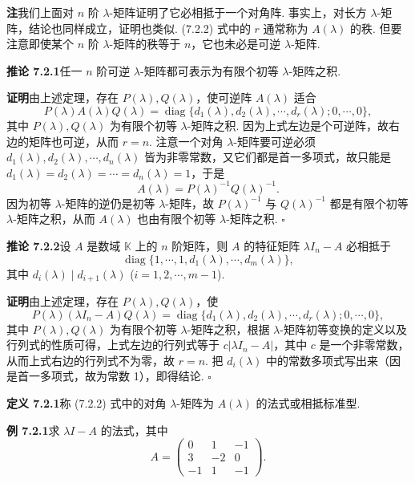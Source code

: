 \documentclass[UTF8,12pt,a4paper,fontset=fandol]{ctexart}
\begin{document}
\noindent\textbf{注}\quad 我们上面对 $n$ 阶 $\lambda$-矩阵证明了它必相抵于一个对角阵. 事实上，对长方 $\lambda$-矩阵，结论也同样成立，证明也类似. (7.2.2) 式中的 $r$ 通常称为 $A(\lambda)$ 的秩. 但要注意即使某个 $n$ 阶 $\lambda$-矩阵的秩等于 $n$，它也未必是可逆 $\lambda$-矩阵.

\noindent\textbf{推论 7.2.1}\quad 任一 $n$ 阶可逆 $\lambda$-矩阵都可表示为有限个初等 $\lambda$-矩阵之积.

\noindent\textbf{证明}\quad 由上述定理，存在 $P(\lambda),Q(\lambda)$，使可逆阵 $A(\lambda)$ 适合
\[
P(\lambda)A(\lambda)Q(\lambda)=\operatorname{diag}\{d_1(\lambda),d_2(\lambda),\cdots,d_r(\lambda);0,\cdots,0\},
\]
其中 $P(\lambda),Q(\lambda)$ 为有限个初等 $\lambda$-矩阵之积. 因为上式左边是个可逆阵，故右边的矩阵也可逆，从而 $r=n$. 注意一个对角 $\lambda$-矩阵要可逆必须 $d_1(\lambda),d_2(\lambda),\cdots,d_n(\lambda)$ 皆为非零常数，又它们都是首一多项式，故只能是 $d_1(\lambda)=d_2(\lambda)=\cdots=d_n(\lambda)=1$，于是
\[
A(\lambda)=P(\lambda)^{-1}Q(\lambda)^{-1}.
\]
因为初等 $\lambda$-矩阵的逆仍是初等 $\lambda$-矩阵，故 $P(\lambda)^{-1}$ 与 $Q(\lambda)^{-1}$ 都是有限个初等 $\lambda$-矩阵之积，从而 $A(\lambda)$ 也由有限个初等 $\lambda$-矩阵之积. $\square$

\noindent\textbf{推论 7.2.2}\quad 设 $A$ 是数域 $\mathbb{K}$ 上的 $n$ 阶矩阵，则 $A$ 的特征矩阵 $\lambda I_n-A$ 必相抵于
\begin{equation}
\operatorname{diag}\{1,\cdots,1,d_1(\lambda),\cdots,d_m(\lambda)\},
\tag{7.2.3}
\end{equation}
其中 $d_i(\lambda)\mid d_{i+1}(\lambda)$ ($i=1,2,\cdots,m-1$).

\noindent\textbf{证明}\quad 由上述定理，存在 $P(\lambda),Q(\lambda)$，使
\[
P(\lambda)(\lambda I_n-A)Q(\lambda)=\operatorname{diag}\{d_1(\lambda),d_2(\lambda),\cdots,d_r(\lambda);0,\cdots,0\},
\]
其中 $P(\lambda),Q(\lambda)$ 为有限个初等 $\lambda$-矩阵之积，根据 $\lambda$-矩阵初等变换的定义以及行列式的性质可得，上式左边的行列式等于 $c|\lambda I_n-A|$，其中 $c$ 是一个非零常数，从而上式右边的行列式不为零，故 $r=n$. 把 $d_i(\lambda)$ 中的常数多项式写出来（因是首一多项式，故为常数 1），即得结论. $\square$

\noindent\textbf{定义 7.2.1}\quad 称 (7.2.2) 式中的对角 $\lambda$-矩阵为 $A(\lambda)$ 的法式或相抵标准型.

\noindent\textbf{例 7.2.1}\quad 求 $\lambda I-A$ 的法式，其中
\[
A=\left(\begin{array}{ccc}
0 & 1 & -1\\
3 & -2 & 0\\
-1 & 1 & -1
\end{array}\right).
\]
\end{document}
